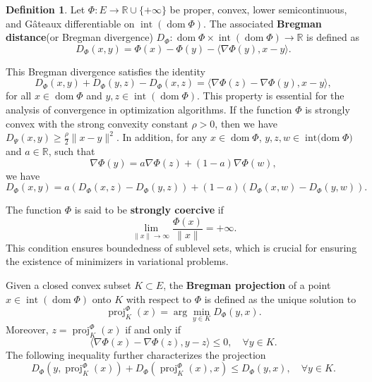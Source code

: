\documentclass[hidelinks,11 pt]{article}
\numberwithin{equation}{section}
\theoremstyle{definition}  %
\newtheorem{definition}[theorem]{Definition}
\numberwithin{equation}{section}
\numberwithin{theorem}{section}
\begin{document}
\vskip 2mm
\begin{definition}
Let \( \Phi: E \to \mathbb{R} \cup \{+\infty\} \) be proper, convex, lower semicontinuous, and Gâteaux differentiable on \( \operatorname{int}(\operatorname{dom} \Phi) \). The associated \textbf{Bregman distance}(or Bregman divergence) \( D_\Phi: \operatorname{dom} \Phi \times \operatorname{int}(\operatorname{dom} \Phi) \to \mathbb{R} \) is defined as
\[
D_\Phi(x, y) = \Phi(x) - \Phi(y) - \langle \nabla \Phi(y), x - y \rangle.
\]
\end{definition}

\vskip 2mm
This Bregman divergence satisfies the identity
\begin{equation}\label{bregman_identity}
D_\Phi(x, y) + D_\Phi(y, z) - D_\Phi(x, z) = \langle \nabla \Phi(z) - \nabla \Phi(y), x - y \rangle,
\end{equation}
for all \( x \in \operatorname{dom} \Phi \) and \( y, z \in \operatorname{int}(\operatorname{dom} \Phi) \). This property is essential for the analysis of convergence in optimization algorithms. If the function $\Phi$ is strongly convex with the strong convexity constant $\rho>0$, then we have $  D_{\Psi}(x,y)\geq \frac{\rho}{2}\|x-y\|^{2}$. In addition, for any $x\in \operatorname{dom} \Phi$, $y,z,w\in \operatorname{int (dom} \Phi)$ and $a\in\mathbb{R}$, such that 
\begin{equation*}
    \nabla \Phi (y) = a\nabla \Phi (z)+(1-a)\nabla\Phi(w), 
\end{equation*}
we have 
\begin{equation}\label{2.3}
    D_{\Phi}(x,y) = a\left(D_{\Phi}(x,z)-D_{\Phi}(y,z)\right)+(1-a)\left(D_{\Phi}(x,w)-D_{\Phi}(y,w)\right). 
\end{equation}

\vskip 2mm
The function \( \Phi \) is said to be \textbf{strongly coercive} if
\[
\lim_{\|x\| \to \infty} \frac{\Phi(x)}{\|x\|} = +\infty.
\]
This condition ensures boundedness of sublevel sets, which is crucial for ensuring the existence of minimizers in variational problems.

\vskip 2mm
Given a closed convex subset \( K \subset E \), the \textbf{Bregman projection} of a point \( x \in \operatorname{int}(\operatorname{dom} \Phi) \) onto \( K \) with respect to \( \Phi \) is defined as the unique solution to
\[
\operatorname{proj}_K^\Phi(x) = \arg\min_{y \in K} D_\Phi(y, x).
\]
Moreover, \( z = \operatorname{proj}_K^\Phi(x) \) if and only if
\begin{equation}\label{proj_vi}
\langle \nabla \Phi(x) - \nabla \Phi(z), y - z \rangle \leq 0, \quad \forall y \in K.
\end{equation}
The following inequality further characterizes the projection
\begin{equation}\label{bregman_projection_ineq}
D_\Phi(y, \operatorname{proj}_K^\Phi(x)) + D_\Phi(\operatorname{proj}_K^\Phi(x), x) \leq D_\Phi(y, x), \quad \forall y \in K.
\end{equation}
\end{document}
